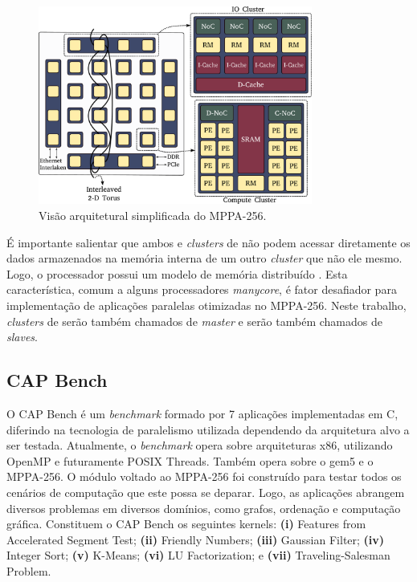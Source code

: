 \documentclass[a4paper,11pt]{article}
\newcommand{\mppa}{MPPA-256\xspace}
\newcommand{\capb}{CAP Bench\xspace}
\newcommand{\manycore}{\textit{manycore}\xspace}
\begin{document}
\begin{figure}[t]
\centering
\includegraphics[width=9cm, keepaspectratio]{figs/mppa-overview.pdf}
\caption{Visão arquitetural simplificada do \mppa \cite{Penna2018}.}\par
\label{fig:mppaOverview}
\end{figure}

É importante salientar que ambos \ccs e \textit{clusters} de \io não podem acessar diretamente os dados armazenados na memória interna de um outro \textit{cluster} que não ele mesmo. Logo, o processador possui um modelo de memória distribuído \cite{Castro-Souza-CCPE:2016, Podesta2018}. Esta característica, comum a alguns processadores \manycore, é fator desafiador para implementação de aplicações paralelas otimizadas no \mppa \cite{Castro-IA3-JPDC:2014}. Neste trabalho, \textit{clusters} de \io serão também chamados de \textit{master} e \ccs serão também chamados de \textit{slaves}.

\subsection{\capb}
\label{subsec:capb}

O \capb é um \textit{benchmark} formado por 7 aplicações implementadas em C, diferindo na tecnologia de paralelismo utilizada dependendo da arquitetura alvo a ser testada. Atualmente, o \textit{benchmark} opera sobre arquiteturas x86, utilizando OpenMP e futuramente POSIX Threads. Também opera sobre o gem5 e o \mppa. O módulo voltado ao \mppa foi construído para testar todos os cenários de computação que este possa se deparar. Logo, as aplicações abrangem diversos problemas em diversos domínios, como grafos, ordenação e computação gráfica. Constituem o \capb os seguintes kernels: \textbf{(i)} Features from Accelerated Segment Test; \textbf{(ii)} Friendly Numbers; \textbf{(iii)} Gaussian Filter; \textbf{(iv)} Integer Sort; \textbf{(v)} K-Means; \textbf{(vi)} LU Factorization; e \textbf{(vii)} Traveling-Salesman Problem.
\end{document}
